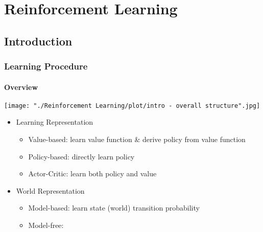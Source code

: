 \chapter{Reinforcement Learning}

\section{Introduction}

\subsection{Learning Procedure}
\subsubsection{Overview}
\texttt{[image: "./Reinforcement Learning/plot/intro - overall structure".jpg]}
\begin{itemize}
\item Learning Representation
	\begin{itemize}
	\item Value-based: learn value function \& derive policy from value function
	\item Policy-based: directly learn policy
	\item Actor-Critic: learn both policy and value
	\end{itemize}
	
\item World Representation
	\begin{itemize}
	\item Model-based: learn state (world) transition probability
	\item Model-free: 
	\end{itemize}
\end{itemize}

